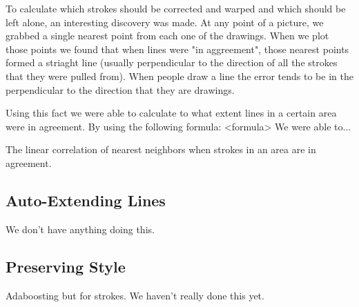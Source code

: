 To calculate which strokes should be corrected and warped and which should be left alone, an interesting discovery was made. At any point of a picture, we grabbed a single nearest point from each one of the drawings. When we plot those points we found that when lines were "in aggreement", those nearest points formed a striaght line (usually perpendicular to the direction of all the strokes that they were pulled from). When people draw a line the error tends to be in the perpendicular to the direction that they are drawings.

Using this fact we were able to calculate to what extent lines in a certain area were in agreement. By using the following formula:
<formula>
We were able to...

The linear correlation of nearest neighbors when strokes in an area are in agreement.

\subsection{Auto-Extending Lines}
We don't have anything doing this.

\subsection{Preserving Style}
Adaboosting but for strokes. We haven't really done this yet.

